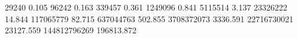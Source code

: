 29240        0.105
96242        0.163
339457       0.361
1249096      0.841
5115514      3.137
23326222     14.844
117065779    82.715
637044763    502.855
3708372073   3336.591
22716730021  23127.559
144812796269 196813.872
